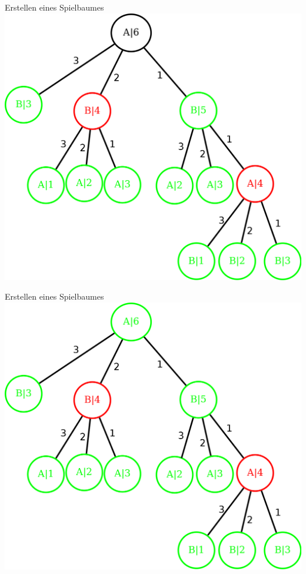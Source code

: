 \documentclass[18pt]{beamer}
\begin{document}
\begin{frame}{Erstellen eines Spielbaumes}
\includegraphics[scale=0.55]{baum7.png}
\end{frame}

\begin{frame}{Erstellen eines Spielbaumes}
\includegraphics[scale=0.55]{baum8.png}
\end{frame}
\end{document}
